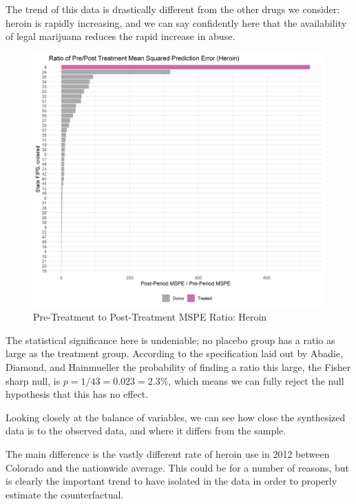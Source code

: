\documentclass{article}
\begin{document}
The trend of this data is drastically different from the other drugs we consider: heroin is rapidly increasing, and we can say confidently here that the availability of legal marijuana reduces the rapid increase in abuse. 

\begin{figure}[H]
    \begin{center}
        \includegraphics[width=.85\textwidth]{Figure_MSPERat_Heroin.png}
    \end{center}
    \caption{Pre-Treatment to Post-Treatment MSPE Ratio: Heroin}
    \label{fig:HerMSPER}
\end{figure}

The statistical significance here is undeniable; no placebo group has a ratio as large as the treatment group. According to the specification laid out by Abadie, Diamond, and Hainmueller \citeyearpar{SynthControl} the probability of finding a ratio this large, the Fisher sharp null, is $p=1/43 = 0.023 = 2.3\%$, which means we can fully reject the null hypothesis that this has no effect.

Looking closely at the balance of variables, we can see how close the synthesized data is to the observed data, and where it differs from the sample.



The main difference is the vastly different rate of heroin use in 2012 between Colorado and the nationwide average. This could be for a number of reasons, but is clearly the important trend to have isolated in the data in order to properly estimate the counterfactual.
\end{document}
